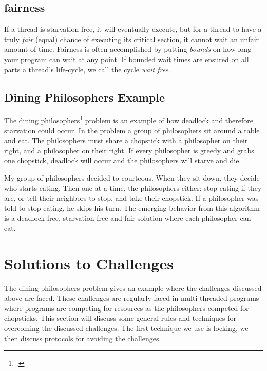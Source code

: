 \documentclass[titlepage]{article}
\begin{document}
\subsection{fairness}

If a thread is starvation free, it will eventually execute, but for a thread to have a truly \textit{fair} (equal) chance of executing its critical section, it cannot wait an unfair amount of time. Fairness is often accomplished by putting \textit{bounds} on how long your program can wait at any point. If bounded wait times are ensured on all parts a thread's life-cycle, we call the cycle \textit{wait free}.

\subsection{Dining Philosophers Example}

The dining philosophers\footcite[original notes on concurrency from dijkstra]{Dijkstra:1965:CSP:1102034} problem is an example of how deadlock and therefore starvation could occur. In the problem a group of philosophers sit around a table and eat. The philosophers must share a chopstick with a philosopher on their right, and a philosopher on their right. If every philosopher is greedy and grabs one chopstick, deadlock will occur and the philosophers will starve and die.

My group of philosophers decided to courteous. When they sit down, they decide who starts eating. Then one at a time, the philosophers either: stop eating if they are, or tell their neighbors to stop, and take their chopstick. If a philosopher was told to stop eating, he skips his turn. The emerging behavior from this algorithm is a deadlock-free, starvation-free and fair solution where each philosopher can eat.

\iffalse
\begin{itemize}
    \item readers-writers problem (requires waiting)
    \item producer consumer (1--1) (interrupts) vs consumer consumer (M--M)(roles) (the philosophers are both)
    \item readers-writers problem (requires waiting)
\end{itemize}
\fi


\section{Solutions to Challenges}
The dining philosophers problem gives an example where the challenges discussed above are faced. These challenges are regularly faced in multi-threaded programs where programs are competing for resources as the philosophers competed for chopsticks. This section will discuss some general rules and techniques for overcoming the discussed challenges. The first technique we use is locking, we then discuss protocols for avoiding the challenges.
\end{document}
